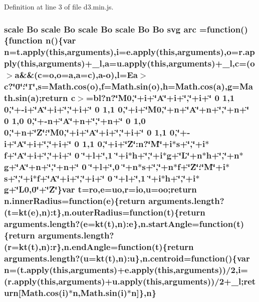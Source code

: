 Definition at line 3 of file d3.\+min.\+js.

\subsubsection[{arc}]{ {\bf scale} {\bf Bo} {\bf scale} {\bf Bo} {\bf scale} {\bf Bo} {\bf scale} {\bf Bo} {\bf Bo} {\bf svg} arc =function()\{function {\bf n}()\{var {\bf n}=t.\+apply({\bf this},arguments),{\bf i}=e.\+apply({\bf this},arguments),{\bf o}=r.\+apply({\bf this},arguments)+{\bf \+\_\+l},{\bf a}=u.\+apply({\bf this},arguments)+{\bf \+\_\+l},{\bf c}=({\bf o}$>${\bf a}\&\&({\bf c}={\bf o},{\bf o}={\bf a},{\bf a}={\bf c}),{\bf a}-\/{\bf o}),l={\bf Ea}$>${\bf c}?\char`\"{}0\char`\"{}\+:\char`\"{}1\char`\"{},s=Math.\+cos({\bf o}),{\bf f}=Math.\+sin({\bf o}),h=Math.\+cos({\bf a}),g=Math.\+sin({\bf a});{\bf return} {\bf c}$>$={\bf bl}?{\bf n}?\char`\"{}M0,\char`\"{}+i+\char`\"{}A\char`\"{}+i+\char`\"{},\char`\"{}+{\bf i}+\char`\"{} 0 1,1 0,\char`\"{}+-\/{\bf i}+\char`\"{}A\char`\"{}+i+\char`\"{},\char`\"{}+{\bf i}+\char`\"{} 0 1,1 0,\char`\"{}+{\bf i}+\char`\"{}M0,\char`\"{}+n+\char`\"{}A\char`\"{}+n+\char`\"{},\char`\"{}+{\bf n}+\char`\"{} 0 1,0 0,\char`\"{}+-\/{\bf n}+\char`\"{}A\char`\"{}+n+\char`\"{},\char`\"{}+{\bf n}+\char`\"{} 0 1,0 0,\char`\"{}+{\bf n}+\char`\"{}Z\char`\"{}\+:\char`\"{}M0,\char`\"{}+i+\char`\"{}A\char`\"{}+i+\char`\"{},\char`\"{}+{\bf i}+\char`\"{} 0 1,1 0,\char`\"{}+-\/{\bf i}+\char`\"{}A\char`\"{}+i+\char`\"{},\char`\"{}+{\bf i}+\char`\"{} 0 1,1 0,\char`\"{}+{\bf i}+\char`\"{}Z\char`\"{}\+:n?\char`\"{}M\char`\"{}+i$\ast$s+\char`\"{},\char`\"{}+{\bf i}$\ast${\bf f}+\char`\"{}A\char`\"{}+i+\char`\"{},\char`\"{}+{\bf i}+\char`\"{} 0 \char`\"{}+l+\char`\"{},1 \char`\"{}+{\bf i}$\ast$h+\char`\"{},\char`\"{}+{\bf i}$\ast$g+\char`\"{}L\char`\"{}+n$\ast$h+\char`\"{},\char`\"{}+{\bf n}$\ast$g+\char`\"{}A\char`\"{}+n+\char`\"{},\char`\"{}+{\bf n}+\char`\"{} 0 \char`\"{}+l+\char`\"{},0 \char`\"{}+{\bf n}$\ast$s+\char`\"{},\char`\"{}+{\bf n}$\ast${\bf f}+\char`\"{}Z\char`\"{}\+:\char`\"{}M\char`\"{}+i$\ast$s+\char`\"{},\char`\"{}+{\bf i}$\ast${\bf f}+\char`\"{}A\char`\"{}+i+\char`\"{},\char`\"{}+{\bf i}+\char`\"{} 0 \char`\"{}+l+\char`\"{},1 \char`\"{}+{\bf i}$\ast$h+\char`\"{},\char`\"{}+{\bf i}$\ast$g+\char`\"{}L0,0\char`\"{}+\char`\"{}Z\char`\"{}\}var t={\bf ro},{\bf e}={\bf uo},{\bf r}={\bf io},u={\bf oo};{\bf return} n.\+inner\+Radius=function({\bf e})\{{\bf return} arguments.\+length?(t=kt({\bf e}),{\bf n})\+:t\},n.\+outer\+Radius=function(t)\{{\bf return} arguments.\+length?({\bf e}=kt(t),{\bf n})\+:{\bf e}\},n.\+start\+Angle=function(t)\{{\bf return} arguments.\+length?({\bf r}=kt(t),{\bf n})\+:{\bf r}\},n.\+end\+Angle=function(t)\{{\bf return} arguments.\+length?(u=kt(t),{\bf n})\+:u\},{\bf n.\+centroid}=function()\{var {\bf n}=(t.\+apply({\bf this},arguments)+e.\+apply({\bf this},arguments))/2,{\bf i}=(r.\+apply({\bf this},arguments)+u.\+apply({\bf this},arguments))/2+{\bf \+\_\+l};{\bf return}[Math.\+cos({\bf i})$\ast${\bf n},Math.\+sin({\bf i})$\ast${\bf n}]\},{\bf n}\}}\label{d3_8min_8js_a54f47b539f1ed4f2ecf212759b4421cc}


